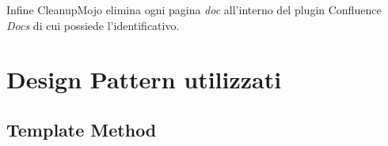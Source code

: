 Infine CleanupMojo elimina ogni pagina \emph{doc} all'interno del plugin Confluence \emph{Docs} di cui possiede l'identificativo.








\section{Design Pattern utilizzati} %

\subsection{Template Method}

